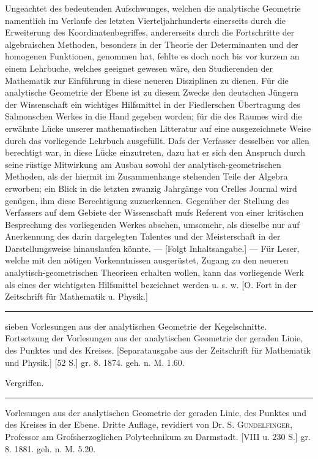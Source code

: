 \documentclass[11pt]{article}
\begin{document}
\glqq{}Ungeachtet des bedeutenden Aufschwunges, welchen die analytische Geometrie namentlich im Verlaufe des letzten Vierteljahrhunderts einerseits durch die Erweiterung des Koordinatenbegriffes, andererseits durch die Fortschritte der algebraischen Methoden, besonders in der Theorie der Determinanten und der homogenen Funktionen, genommen hat, fehlte es doch noch bis vor kurzem an einem Lehrbuche, welches geeignet gewesen w\"are, den Studierenden der Mathematik zur Einf\"uhrung in diese neueren Disziplinen zu dienen. F\"ur die analytische Geometrie der Ebene ist zu diesem Zwecke den deutschen J\"ungern der Wissenschaft ein wichtiges Hilfsmittel in der Fiedlerschen \"Ubertragung des Salmonschen Werkes in die Hand gegeben worden; f\"ur die des Raumes wird die erw\"ahnte L\"ucke unserer mathematischen Litteratur auf eine ausgezeichnete Weise durch das vorliegende Lehrbuch ausgef\"ullt. Dafs der Verfasser desselben vor allen berechtigt war, in diese L\"ucke einzutreten, dazu hat er sich den Anspruch durch seine r\"ustige Mitwirkung am Ausbau sowohl der analytisch-geometrischen Methoden, als der hiermit im Zusammenhange stehenden Teile der Algebra erworben; ein Blick in die letzten zwanzig Jahrg\"ange von Crelles Journal wird gen\"ugen, ihm diese Berechtigung zuzuerkennen. Gegen\"uber der Stellung des Verfassers auf dem Gebiete der Wissenschaft mufs Referent von einer kritischen Besprechung des vorliegenden Werkes absehen, umsomehr, als dieselbe nur auf Anerkennung des darin dargelegten Talentes und der Meisterschaft in der Darstellungsweise hinauslaufen k\"onnte. --- [Folgt Inhaltsangabe.] --- F\"ur Leser, welche mit den n\"otigen Vorkenntnissen ausger\"ustet, Zugang zu den neueren analytisch-geometrischen Theorieen erhalten wollen, kann das vorliegende Werk als eines der wichtigsten Hilfsmittel bezeichnet werden u. s. w.\grqq{} \hfill [O. Fort in der Zeitschrift f\"ur Mathematik u. Physik.]

\rule{6em}{0.4pt} sieben Vorlesungen aus der analytischen Geometrie der Kegelschnitte. Fortsetzung der Vorlesungen aus der analytischen Geometrie der geraden Linie, des Punktes und des Kreises. [Separatausgabe aus der Zeitschrift f\"ur Mathematik und Physik.] [52 S.] gr. 8. 1874. geh. \hfill n. M. 1.60.

Vergriffen.

\rule{6em}{0.4pt} Vorlesungen aus der analytischen Geometrie der geraden Linie, des Punktes und des Kreises in der Ebene. Dritte Auflage, revidiert von Dr. S. \textsc{Gundelfinger}, Professor am Grofsherzoglichen Polytechnikum zu Darmstadt. [VIII u. 230 S.] gr. 8. 1881. geh. \hfill n. M. 5.20.
\end{document}
